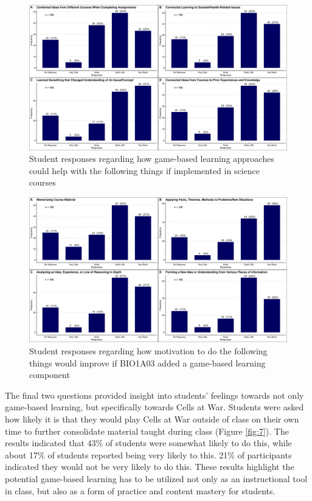 \documentclass[10pt]{article}
\providecommand{\figref}[1]{(Figure \ref{#1})}  %
\begin{document}
\begin{figure}[H]
	\includegraphics[width=\textwidth]{figures_4f06/how_does_gbl_help_in_science.jpg}
	\caption{Student responses regarding how game-based learning approaches could help with the following things if implemented in science courses}
	\label{fig:5}
\end{figure}

\begin{figure}[H]
	\includegraphics[width=\textwidth]{figures_4f06/ifbio1a03_added_gblcomponent.jpg}
	\caption{Student responses regarding how motivation to do the following things would improve if BIO1A03 added a game-based learning component}
	\label{fig:6}
\end{figure}

The final two questions provided insight into students' feelings towards not only game-based learning, but specifically towards Cells at War. Students were asked how likely it is that they would play Cells at War outside of class on their own time to further consolidate material taught during class \figref{fig:7}. The results indicated that 43\% of students were somewhat likely to do this, while about 17\% of students reported being very likely to this. 21\% of participants indicated they would not be very likely to do this. These results highlight the potential game-based learning has to be utilized not only as an instructional tool in class, but also as a form of practice and content mastery for students. 
\end{document}
